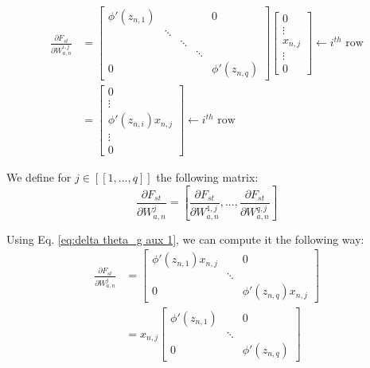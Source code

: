 \documentclass[twocolumn,a4paper]{svjour3} \sloppy          \smartqed
\begin{document}
\begin{align}
\frac{\partial F_{st}}{\partial W_{a,n}^{i,j}}
&= \begin{bmatrix}
   \phi'(z_{n,1}) &  &  & & 0\\ 
   & \ddots &  & & \\ 
   &  &  \ddots & & \\
   &  &         & \ddots & \\
  0 &  &   &  & \phi'(z_{n,q}) 
 \end{bmatrix} \begin{bmatrix} 
0 \\
\vdots \\
x_{n,j} \\
\vdots \\
0
\end{bmatrix}
\leftarrow i^{th} \mbox{ row} \\
&= \begin{bmatrix} 
0 \\
\vdots \\
\phi'(z_{n,i}) x_{n,j} \\
\vdots \\
0
\end{bmatrix}
\leftarrow i^{th} \mbox{ row} \label{eq:delta theta_g aux 1}
\end{align} 

We define for $j \in [\![ 1, ..., q ]\!]$ the following matrix:
\begin{equation} \label{eq: def partial F_st over partial W_a,n^j}
\frac{\partial F_{st}}{\partial W_{a,n}^j} = 
\left[ \frac{\partial F_{st}}{\partial W_{a,n}^{1,j}}, ..., \frac{\partial F_{st}}{\partial W_{a,n}^{q,j}} \right]
\end{equation}

Using Eq. \ref{eq:delta theta_g aux 1}, we can compute it the following way:
\begin{align}
\frac{\partial F_{st}}{\partial W_{a,n}^j} &= 
 \begin{bmatrix}
   \phi'(z_{n,1}) x_{n,j} & & 0\\ 
   & \ddots &  \\ 
  0 &  & \phi'(z_{n,q}) x_{n,j}
 \end{bmatrix} \\
 &= x_{n,j} \begin{bmatrix}
   \phi'(z_{n,1}) & & 0\\ 
   & \ddots &  \\ 
  0 &  & \phi'(z_{n,q})
 \end{bmatrix} \label{calculation partial F_st over partial W_a,n^j}
\end{align}
\end{document}
